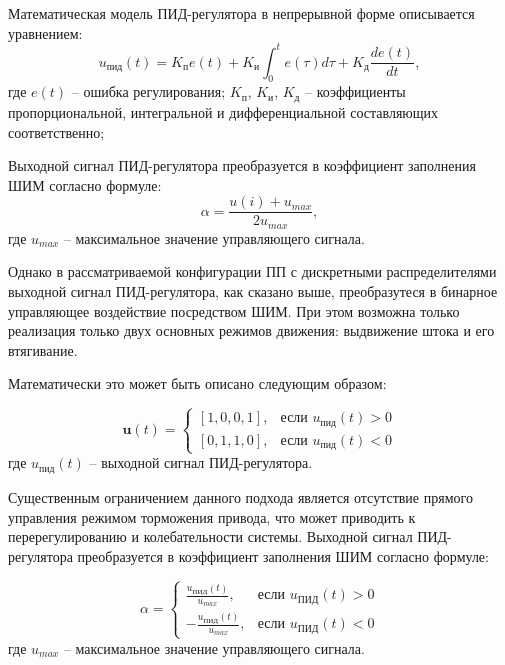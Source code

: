 Математическая модель ПИД-регулятора в непрерывной форме описывается уравнением:
\begin{equation}\label{eq:pid_base}
	u_{\text{пид}}(t) = K_{\text{п}} e(t) + K_{\text{и}} \int_0^t e(\tau)d\tau + K_{\text{д}}\frac{de(t)}{dt},
\end{equation}
где
$e(t)$ -- ошибка регулирования;
$K_\text{п}$, $K_\text{и}$, $K_\text{д}$ -- коэффициенты пропорциональной, интегральной и
дифференциальной составляющих соответственно;

Выходной сигнал ПИД-регулятора преобразуется в коэффициент заполнения ШИМ согласно формуле:
\begin{equation*}
	\alpha = \frac{u(i) + u_{max}}{2u_{max}},
\end{equation*}
где $u_{max}$ -- максимальное значение управляющего сигнала.

Однако в рассматриваемой конфигурации ПП с дискретными распределителями
выходной сигнал ПИД-регулятора, как сказано выше, преобразутеся в бинарное
управляющее воздействие посредством ШИМ. При этом возможна только реализация
только двух основных режимов движения: выдвижение штока и его втягивание.

Математически это может быть описано следующим образом:

\begin{equation*}
	\mathbf{u}(t) = \begin{cases}
		[1,0,0,1], & \text{если } u_\text{пид}(t) > 0 \\
		[0,1,1,0], & \text{если } u_\text{пид}(t) < 0
	\end{cases}
\end{equation*}
где $u_\text{пид}(t)$ -- выходной сигнал ПИД-регулятора.

Существенным ограничением данного подхода является отсутствие
прямого управления режимом торможения привода, что может приводить к
перерегулированию и колебательности системы. Выходной сигнал ПИД-регулятора
преобразуется в коэффициент заполнения ШИМ согласно формуле:

\begin{equation*}
	\alpha = \begin{cases}
		\frac{u_\text{ПИД}(t)}{u_{max}},  & \text{если } u_\text{ПИД}(t) > 0 \\
		-\frac{u_\text{ПИД}(t)}{u_{max}}, & \text{если } u_\text{ПИД}(t) < 0
	\end{cases}
\end{equation*}
где $u_{max}$ -- максимальное значение управляющего сигнала.

